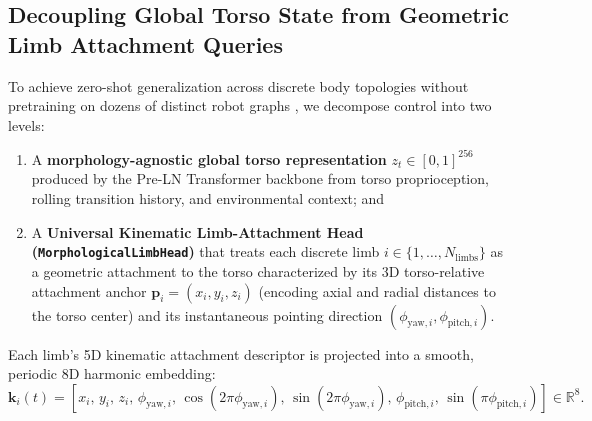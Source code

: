 \documentclass[11pt,a4paper]{article}
\begin{document}
\subsection{Decoupling Global Torso State from Geometric Limb Attachment Queries}
To achieve zero-shot generalization across discrete body topologies without pretraining on dozens of distinct robot graphs \cite{gupta2022metamorph}, we decompose control into two levels:
\begin{enumerate}
    \item A \textbf{morphology-agnostic global torso representation} $z_t \in [0, 1]^{256}$ produced by the Pre-LN Transformer backbone from torso proprioception, rolling transition history, and environmental context; and
    \item A \textbf{Universal Kinematic Limb-Attachment Head (\texttt{MorphologicalLimbHead})} that treats each discrete limb $i \in \{1, \dots, N_{\text{limbs}}\}$ as a geometric attachment to the torso characterized by its 3D torso-relative attachment anchor $\mathbf{p}_i = (x_i, y_i, z_i)$ (encoding axial and radial distances to the torso center) and its instantaneous pointing direction $(\phi_{\text{yaw},i}, \phi_{\text{pitch},i})$.
\end{enumerate}

Each limb's 5D kinematic attachment descriptor is projected into a smooth, periodic 8D harmonic embedding:
\begin{equation}
    \mathbf{k}_i(t) = \left[x_i,\, y_i,\, z_i,\, \phi_{\text{yaw},i},\, \cos(2\pi\phi_{\text{yaw},i}),\, \sin(2\pi\phi_{\text{yaw},i}),\, \phi_{\text{pitch},i},\, \sin(\pi\phi_{\text{pitch},i})\right] \in \mathbb{R}^8.
\end{equation}
\end{document}
